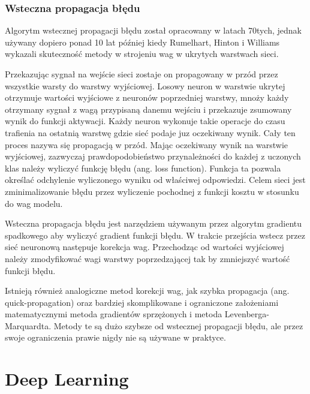 \documentclass[12pt,a4paper,twoside,titlepage,openright]{book}
\begin{document}
\subsection{Wsteczna propagacja błędu}
Algorytm wstecznej propagacji błędu został opracowany w latach 70tych, jednak używany dopiero ponad 10 lat później kiedy Rumelhart, Hinton i Williams wykazali skuteczność metody w strojeniu wag w ukrytych warstwach sieci.

Przekazując sygnał na wejście sieci zostaje on propagowany w przód przez wszystkie warsty do warstwy wyjściowej. Losowy neuron w warstwie ukrytej otrzymuje wartości wyjściowe z neuronów poprzedniej warstwy, mnoży każdy otrzymany sygnał z wagą przypisaną danemu wejściu i przekazuje zsumowany wynik do funkcji aktywacji. Każdy neuron wykonuje takie operacje do czasu trafienia na ostatnią warstwę gdzie sieć podaje juz oczekiwany wynik. Cały ten proces nazywa się propagacją w przód. Mając oczekiwany wynik na warstwie wyjściowej, zazwyczaj prawdopodobieństwo przynależności do każdej z uczonych klas należy wyliczyć funkcję błędu (ang. loss function). Funkcja ta pozwala określać odchylenie wyliczonego wyniku od właściwej odpowiedzi. Celem sieci jest zminimalizowanie błędu przez wyliczenie pochodnej z funkcji kosztu w stosunku do wag modelu.

Wsteczna propagacja błędu jest narzędziem używanym przez algorytm gradientu spadkowego aby wyliczyć gradient funkcji błędu. W trakcie przejścia wstecz przez sieć neuronową następuje korekcja wag. Przechodząc od wartości wyjściowej należy zmodyfikować wagi warstwy poprzedzającej tak by zmniejszyć wartość funkcji błędu.

Istnieją również analogiczne metod korekcji wag, jak szybka propagacja (ang. quick-propagation) oraz bardziej skomplikowane i ograniczone założeniami matematycznymi metoda gradientów sprzężonych i metoda Levenberga-Marquardta. Metody te są dużo szybsze od wstecznej propagacji błędu, ale przez swoje ograniczenia prawie nigdy nie są używane w praktyce. \cite{odkrywanieSieci}



\chapter{Deep Learning}
\end{document}
